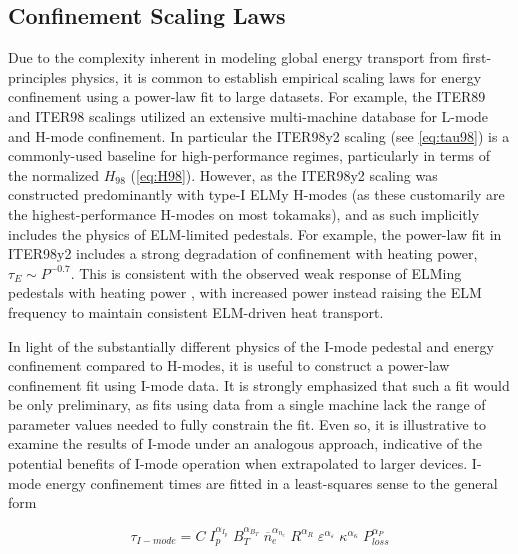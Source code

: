 \subsection{Confinement Scaling Laws}\label{subsec:imode_powerlaws}

Due to the complexity inherent in modeling global energy transport from first-principles physics, it is common to establish empirical scaling laws for energy confinement using a power-law fit to large datasets.  For example, the ITER89 \cite{Yushmanov1990} and ITER98 \cite{ITER1999} scalings utilized an extensive multi-machine database \cite{Christiansen1992} for L-mode and H-mode confinement.  In particular the ITER98y2 scaling (see \cref{eq:tau98}) is a commonly-used baseline for high-performance regimes, particularly in terms of the normalized $H_{98}$ (\cref{eq:H98}).  However, as the ITER98y2 scaling was constructed predominantly with type-I ELMy H-modes (as these customarily are the highest-performance H-modes on most tokamaks), and as such implicitly includes the physics of ELM-limited pedestals.  For example, the power-law fit in ITER98y2 includes a strong degradation of confinement with heating power, $\tau_E \sim P^{-0.7}$.  This is consistent with the observed weak response of ELMing pedestals with heating power \cite{Snyder2007}, with increased power instead raising the ELM frequency to maintain consistent ELM-driven heat transport.

In light of the substantially different physics of the I-mode pedestal and energy confinement compared to H-modes, it is useful to construct a power-law confinement fit using I-mode data.  It is strongly emphasized that such a fit would be only preliminary, as fits using data from a single machine lack the range of parameter values needed to fully constrain the fit.  Even so, it is illustrative to examine the results of I-mode under an analogous approach, indicative of the potential benefits of I-mode operation when extrapolated to larger devices.  I-mode energy confinement times are fitted in a least-squares sense to the general form

\begin{equation}\label{eq:taufit}
 \tau_{I-mode} = C \; I_p^{\alpha_{I_p}} \; B_T^{\alpha_{B_T}} \; \overline{n}_e^{\alpha_{n_e}} \; R^{\alpha_R} \; \varepsilon^{\alpha_\varepsilon} \; \kappa^{\alpha_\kappa} \; P_{loss}^{\alpha_P}
\end{equation}


